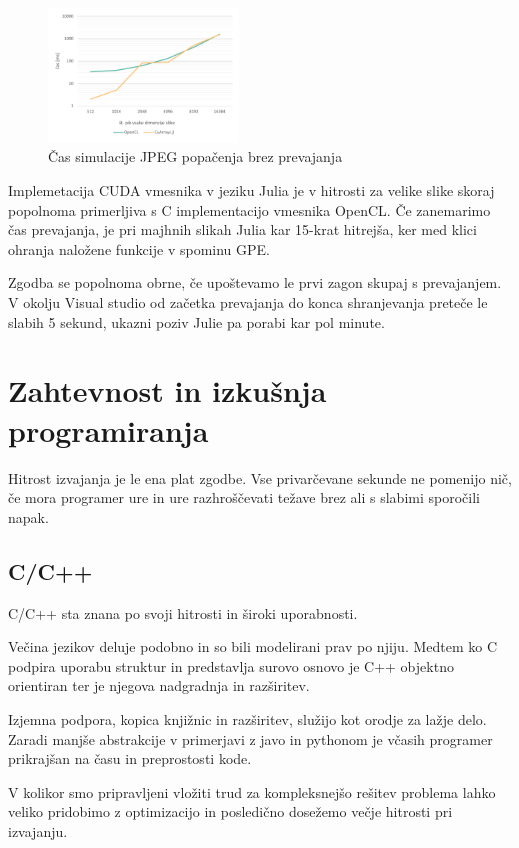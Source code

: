 \documentclass[journal,a4paper,twoside]{sty/IEEEtran}
\begin{document}
\begin{figure}[h]
\includegraphics[width=0.45\textwidth]{jpeg_speed}
\caption{Čas simulacije JPEG popačenja brez prevajanja}
\end{figure}

Implemetacija CUDA vmesnika v jeziku Julia je v hitrosti za velike slike skoraj popolnoma primerljiva s C implementacijo vmesnika OpenCL.
Če zanemarimo čas prevajanja, je pri majhnih slikah Julia kar 15-krat hitrejša, ker med klici ohranja naložene funkcije v spominu GPE.

Zgodba se popolnoma obrne, če upoštevamo le prvi zagon skupaj s prevajanjem.
V okolju Visual studio od začetka prevajanja do konca shranjevanja preteče le slabih 5 sekund, ukazni poziv Julie pa porabi kar pol minute.

\section{Zahtevnost in izkušnja programiranja}

Hitrost izvajanja je le ena plat zgodbe.
Vse privarčevane sekunde ne pomenijo nič, če mora programer ure in ure razhroščevati težave brez ali s slabimi sporočili napak.

\subsection{C/C++}

C/C++ sta znana po svoji hitrosti in široki uporabnosti.

Večina jezikov deluje podobno in so bili modelirani prav po njiju.
Medtem ko C podpira uporabu struktur in predstavlja surovo osnovo je C++ objektno orientiran ter je njegova nadgradnja in razširitev. 

Izjemna podpora, kopica knjižnic in razširitev, služijo kot orodje za lažje delo.
Zaradi manjše abstrakcije v primerjavi z javo in pythonom je včasih programer prikrajšan na času in preprostosti kode.

V kolikor smo pripravljeni vložiti trud za kompleksnejšo rešitev problema lahko veliko pridobimo z optimizacijo in posledično dosežemo večje hitrosti pri
	izvajanju.
\end{document}

